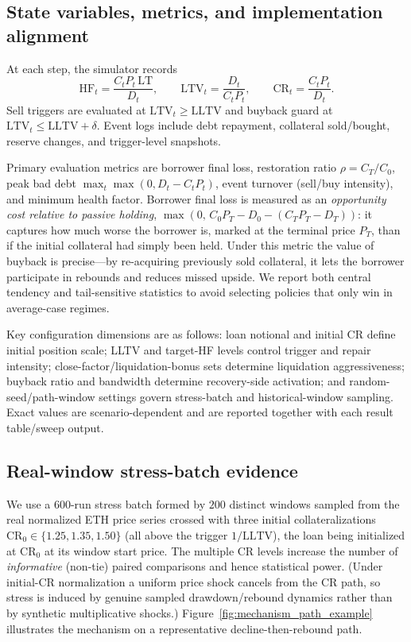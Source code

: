 \documentclass[12pt]{article}
\begin{document}
\subsection{State variables, metrics, and implementation alignment}
At each step, the simulator records
\[
\mathrm{HF}_t = \frac{C_tP_t\,\mathrm{LT}}{D_t},\qquad
\mathrm{LTV}_t = \frac{D_t}{C_tP_t},\qquad
\mathrm{CR}_t = \frac{C_tP_t}{D_t}.
\]
Sell triggers are evaluated at $\mathrm{LTV}_t\ge\mathrm{LLTV}$ and buyback guard at $\mathrm{LTV}_t\le\mathrm{LLTV}+\delta$. Event logs include debt repayment, collateral sold/bought, reserve changes, and trigger-level snapshots.

Primary evaluation metrics are borrower final loss, restoration ratio $\rho=C_T/C_0$, peak bad debt $\max_t\max(0,D_t-C_tP_t)$, event turnover (sell/buy intensity), and minimum health factor. Borrower final loss is measured as an \emph{opportunity cost relative to passive holding}, $\max(0,\,C_0P_T-D_0-(C_TP_T-D_T))$: it captures how much worse the borrower is, marked at the terminal price $P_T$, than if the initial collateral had simply been held. Under this metric the value of buyback is precise---by re-acquiring previously sold collateral, it lets the borrower participate in rebounds and reduces missed upside. We report both central tendency and tail-sensitive statistics to avoid selecting policies that only win in average-case regimes.

Key configuration dimensions are as follows: loan notional and initial CR define initial position scale; LLTV and target-HF levels control trigger and repair intensity; close-factor/liquidation-bonus sets determine liquidation aggressiveness; buyback ratio and bandwidth determine recovery-side activation; and random-seed/path-window settings govern stress-batch and historical-window sampling. Exact values are scenario-dependent and are reported together with each result table/sweep output.

\subsection{Real-window stress-batch evidence}
We use a $600$-run stress batch formed by $200$ distinct windows sampled from the real normalized ETH price series crossed with three initial collateralizations $\mathrm{CR}_0\in\{1.25,1.35,1.50\}$ (all above the trigger $1/\mathrm{LLTV}$), the loan being initialized at $\mathrm{CR}_0$ at its window start price. The multiple CR levels increase the number of \emph{informative} (non-tie) paired comparisons and hence statistical power. (Under initial-CR normalization a uniform price shock cancels from the CR path, so stress is induced by genuine sampled drawdown/rebound dynamics rather than by synthetic multiplicative shocks.)
Figure~\ref{fig:mechanism_path_example} illustrates the mechanism on a representative decline-then-rebound path.
\end{document}
